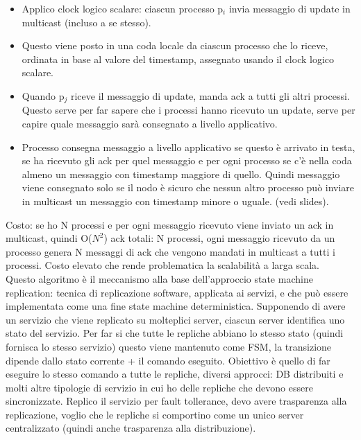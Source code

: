 \documentclass[16px]{article}
\begin{document}
\begin{itemize}
\item Applico clock logico scalare: ciascun processo p$_i$ invia messaggio di update in multicast (incluso a se stesso). 
\item Questo viene posto in una coda locale da ciascun processo che lo riceve, ordinata in base al valore del timestamp, assegnato usando il clock logico scalare. 
\item Quando p$_j$ riceve il messaggio di update, manda ack a tutti gli altri processi. Questo serve per far sapere che i processi hanno ricevuto un update, serve per capire quale messaggio sarà consegnato a livello applicativo.
\item Processo consegna messaggio a livello applicativo se questo è arrivato in testa, se ha ricevuto gli ack per quel messaggio e per ogni processo se c'è nella coda almeno un messaggio con timestamp maggiore di quello. Quindi messaggio viene consegnato solo se il nodo è sicuro che nessun altro processo può inviare in multicast un messaggio con timestamp minore o uguale. (vedi slides).
\end{itemize}
Costo: se ho N processi e per ogni messaggio ricevuto viene inviato un ack in multicast, quindi O($N^2$) ack totali: N processi, ogni messaggio ricevuto da un processo genera N messaggi di ack che vengono mandati in multicast a tutti i processi. Costo elevato che rende problematica la scalabilità a larga scala.\\ Questo algoritmo è il meccanismo alla base dell'approccio state machine replication: tecnica di replicazione software, applicata ai servizi, e che può essere implementata come una fine state machine deterministica. Supponendo di avere un servizio che viene replicato su molteplici server, ciascun server identifica uno stato del servizio. Per far si che tutte le repliche abbiano lo stesso stato (quindi fornisca lo stesso servizio) questo viene mantenuto come FSM, la transizione dipende dallo stato corrente + il comando eseguito. Obiettivo è quello di far eseguire lo stesso comando a tutte le repliche, diversi approcci: DB distribuiti e molti altre tipologie di servizio in cui ho delle repliche che devono essere sincronizzate. Replico il servizio per fault tollerance, devo avere trasparenza alla replicazione, voglio che le repliche si comportino come un unico server centralizzato (quindi anche trasparenza alla distribuzione).
\end{document}
